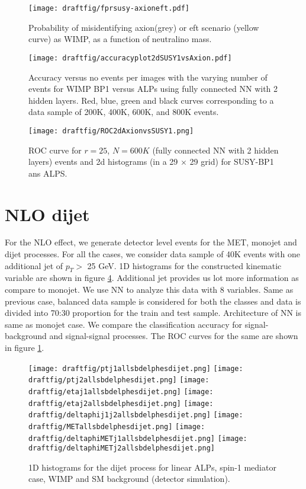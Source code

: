 \documentclass[aps,onecolumn,showpacs,superscriptaddress,groupedaddress,nofootinbib,preprint]{revtex4-1}
\begin{document}
\begin{figure}%
\centering
\texttt{[image: draftfig/fprsusy-axioneft.pdf]}
\caption{Probability of misidentifying axion(grey) or eft scenario (yellow curve) as WIMP, as a function of neutralino mass.}\label{result3}
\end{figure}




 
\begin{figure}%
\centering
\texttt{[image: draftfig/accuracyplot2dSUSY1vsAxion.pdf]}
\caption{Accuracy versus no events per images with the varying number of events for WIMP BP1 versus ALPs using fully connected NN with 2 hidden layers. Red, blue,
green and black curves corresponding to a data sample of 200K, 400K, 600K, and 800K events.} \label{accuracy2}
\end{figure}



\begin{figure}%
\centering
\texttt{[image: draftfig/ROC2dAxionvsSUSY1.png]}
\caption{ROC curve for $r=25$, $N=600K$ (fully connected NN with 2 hidden layers) events and 2d histograms (in a 29 $\times$ 29 grid) for SUSY-BP1 ans ALPS.}\label{roc2d}
\end{figure}

\section{NLO dijet}
For the NLO effect, we generate detector level events for the MET, monojet and dijet processes. For all the cases, we consider data sample of 40K events with one 
additional jet of $p_T>$ 25 GeV. 1D histograms for the constructed kinematic variable are shown in figure \ref{1Dand2DfeaturesDLdijet}. Additional jet provides us lot more 
information as compare to monojet. We use NN to analyze this data with 8 variables. Same as previous case, balanced data sample is considered for both the classes and data 
is divided into 70:30 proportion for the train and test sample. Architecture of NN is same as monojet case. We compare the classification accuracy for signal-background and 
signal-signal processes. The ROC curves for the same are shown in figure \ref{}. 



\begin{figure} [H]
\centering
\texttt{[image: draftfig/ptj1allsbdelphesdijet.png]}
\texttt{[image: draftfig/ptj2allsbdelphesdijet.png]}
\texttt{[image: draftfig/etaj1allsbdelphesdijet.png]}
\texttt{[image: draftfig/etaj2allsbdelphesdijet.png]}
\texttt{[image: draftfig/deltaphij1j2allsbdelphesdijet.png]}
\texttt{[image: draftfig/METallsbdelphesdijet.png]}
\texttt{[image: draftfig/deltaphiMETj1allsbdelphesdijet.png]}
\texttt{[image: draftfig/deltaphiMETj2allsbdelphesdijet.png]}
\caption{1D histograms for the dijet process for linear ALPs, spin-1 mediator case, WIMP and SM background (detector simulation).\label{1Dand2DfeaturesDLdijet}}
\end{figure}
\end{document}
